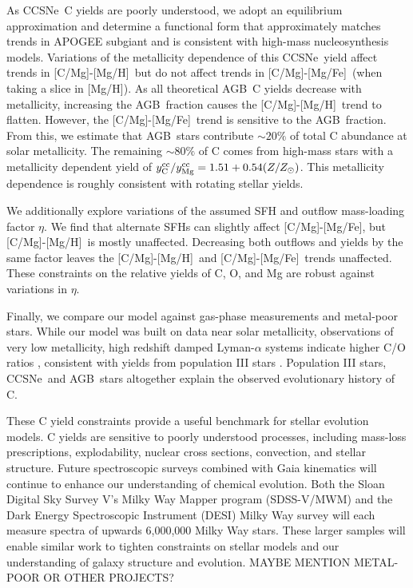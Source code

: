 \documentclass[fleqn,usenatbib]{mnras}
\newcommand{\agb}{AGB}
\newcommand{\apogee}{APOGEE}
\newcommand{\cc}{CCSNe}
\newcommand{\sfh}{SFH}
\newcommand{\caah}{[C/Mg]-[Mg/H]}
\newcommand{\caafe}{[C/Mg]-[Mg/Fe]}
\newcommand{\Ycc}{\ensuremath{y_{\rm C}^{\rm cc}}}
\newcommand{\Yoc}{\ensuremath{y_{\rm Mg}^{\rm cc}}}
\newcommand{\about}[1]{${\sim} #1$}
\begin{document}
As \cc\ C yields are poorly understood, we adopt an equilibrium approximation and determine a functional form that approximately matches trends in \apogee{} subgiant and is consistent with high-mass nucleosynthesis models. Variations of the metallicity dependence of this \cc\ yield affect trends in \caah~but do not affect trends in \caafe\ (when taking a slice in [Mg/H]). As all theoretical \agb\ C yields decrease with metallicity, increasing the \agb\ fraction causes the \caah\ trend to flatten. However, the \caafe\ trend is sensitive to the \agb\ fraction. 
From this, we estimate that \agb\ stars contribute \about{20\%} of total C abundance at solar metallicity. The remaining \about{80\%} of C comes from high-mass stars with a metallicity dependent yield of $\Ycc/\Yoc=1.51 + 0.54 (Z/Z_\odot)$. 
This metallicity dependence is roughly consistent with rotating stellar yields.
 

We additionally explore variations of the assumed \sfh{} and outflow mass-loading factor $\eta$. We find that alternate \sfh{}s can slightly affect \caafe, but \caah~is mostly unaffected. Decreasing both outflows and yields by the same factor leaves the \caah~and \caafe~trends unaffected. These constraints on the relative yields of C, O, and Mg are robust against variations in $\eta$.

Finally, we compare our model against gas-phase measurements and metal-poor stars. While our model was built on data near solar metallicity, observations of very low metallicity, high redshift damped Lyman-$\alpha$ systems indicate higher C/O ratios \citep{cooke+17}, consistent with yields from population III stars \citep[e.g.][]{hirschi07}. Population III stars, \cc\, and \agb\ stars altogether explain the observed evolutionary history of C.

These C yield constraints provide a useful benchmark for stellar evolution models. C yields are sensitive to poorly understood processes, including mass-loss prescriptions, explodability, nuclear cross sections, convection, and stellar structure. Future spectroscopic surveys combined with Gaia kinematics \citep{gaia} will continue to enhance our understanding of chemical evolution. Both the Sloan Digital Sky Survey V's Milky Way Mapper program ({\sc SDSS-V/MWM}) \citep{sdssv} and the Dark Energy Spectroscopic Instrument ({\sc DESI}) Milky Way survey \citep{desi, desi:mw} will each measure spectra of upwards 6,000,000 Milky Way stars. These larger samples will enable similar work to tighten constraints on stellar models and our understanding of galaxy structure and evolution. MAYBE MENTION METAL-POOR OR OTHER PROJECTS?
\end{document}
